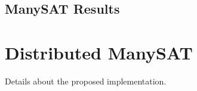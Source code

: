 \documentclass{article}
\begin{document}
\subsection{ManySAT Results}


\section{Distributed ManySAT}
Details about the proposed implementation. 
\end{document}
